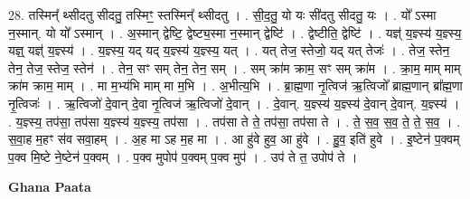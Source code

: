 \documentclass[17pt]{extarticle}
\begin{document}
28. तस्मिन्᳚ थ्सीदतु सीदतु॒ तस्मिꣳ॒॒ स्तस्मिन्᳚ थ्सीदतु । . सी॒द॒तु॒ यो यः सी॑दतु सीदतु॒ यः । . यो᳚ ऽस्मा न॒स्मान्. यो यो᳚ ऽस्मान् । . अ॒स्मान् द्वेष्टि॒ द्वेष्ट्य॒स्मा न॒स्मान् द्वेष्टि॑ । . द्वेष्टीति॒ द्वेष्टि॑ । . यज्ञ्॑ य॒ज्ञ्स्य॑ य॒ज्ञ्स्य॒ यज्ञ्॒ यज्ञ्॑ य॒ज्ञ्स्य॑ । . य॒ज्ञ्स्य॒ यद् यद् य॒ज्ञ्स्य॑ य॒ज्ञ्स्य॒ यत् । . यत् तेज॒ स्तेजो॒ यद् यत् तेजः॑ । . तेज॒ स्तेन॒ तेन॒ तेज॒ स्तेज॒ स्तेन॑ । . तेन॒ सꣳ सम् तेन॒ तेन॒ सम् । . सम् क्रा॑म क्राम॒ सꣳ सम् क्रा॑म । . क्रा॒म॒ माम् माम् क्रा॑म क्राम॒ माम् । . मा म॒भ्य॑भि माम् मा म॒भि । . अ॒भीत्य॒भि । . ब्रा॒ह्म॒णा नृ॒त्विज॑ ऋ॒त्विजो᳚ ब्राह्म॒णान् ब्रा᳚ह्म॒णा नृ॒त्विजः॑ । . ऋ॒त्विजो॑ दे॒वान् दे॒वा नृ॒त्विज॑ ऋ॒त्विजो॑ दे॒वान् । . दे॒वान्. य॒ज्ञ्स्य॑ य॒ज्ञ्स्य॑ दे॒वान् दे॒वान्. य॒ज्ञ्स्य॑ । . य॒ज्ञ्स्य॒ तप॑सा॒ तप॑सा य॒ज्ञ्स्य॑ य॒ज्ञ्स्य॒ तप॑सा । . तप॑सा ते ते॒ तप॑सा॒ तप॑सा ते । . ते॒ स॒व॒ स॒व॒ ते॒ ते॒ स॒व॒ । . स॒वा॒ह म॒हꣳ स॑व सवा॒हम् । . अ॒ह मा ऽह म॒ह मा । . आ हु॑वे हुव॒ आ हु॑वे । . हु॒व॒ इति॑ हुवे । . इ॒ष्टेन॑ प॒क्वम् प॒क्व मि॒ष्टे ने॒ष्टेन॑ प॒क्वम् । . प॒क्व मुपोप॑ प॒क्वम् प॒क्व मुप॑ । . उप॑ ते त॒ उपोप॑ ते । \newline

\textbf{Ghana Paata } \newline
\end{document}
